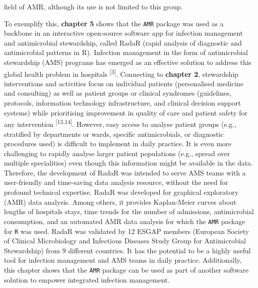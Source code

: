 \documentclass[
]{book}
\begin{document}
field of AMR, although its use is not limited to this group.

To exemplify this, \textbf{chapter 5} shows that the \texttt{AMR} package was used as a backbone in an interactive open-source software app for infection management and antimicrobial stewardship, called RadaR (rapid analysis of diagnostic and antimicrobial patterns in R). Infection management in the form of antimicrobial stewardship (AMS) programs has emerged as an effective solution to address this global health problem in hospitals \textsuperscript{{[}3{]}}. Connecting to \textbf{chapter 2}, stewardship interventions and activities focus on individual patients (personalised medicine and consulting) as well as patient groups or clinical syndromes (guidelines, protocols, information technology infrastructure, and clinical decision support systems) while prioritising improvement in quality of care and patient safety for any intervention \textsuperscript{{[}13,14{]}}. However, easy access to analyse patient groups (e.g., stratified by departments or wards, specific antimicrobials, or diagnostic procedures used) is difficult to implement in daily practice. It is even more challenging to rapidly analyse larger patient populations (e.g., spread over multiple specialities) even though this information might be available in the data. Therefore, the development of RadaR was intended to serve AMS teams with a user-friendly and time-saving data analysis resource, without the need for profound technical expertise. RadaR was developed for graphical exploratory (AMR) data analysis. Among others, it provides Kaplan-Meier curves about lengths of hospitals stays, time trends for the number of admissions, antimicrobial consumption, and an automated AMR data analysis for which the \texttt{AMR} package for \texttt{R} was used. RadaR was validated by 12 ESGAP members (European Society of Clinical Microbiology and Infectious Diseases Study Group for Antimicrobial Stewardship) from 9 different countries. It has the potential to be a highly useful tool for infection management and AMS teams in daily practice. Additionally, this chapter shows that the \texttt{AMR} package can be used as part of another software solution to empower integrated infection management.
\end{document}
